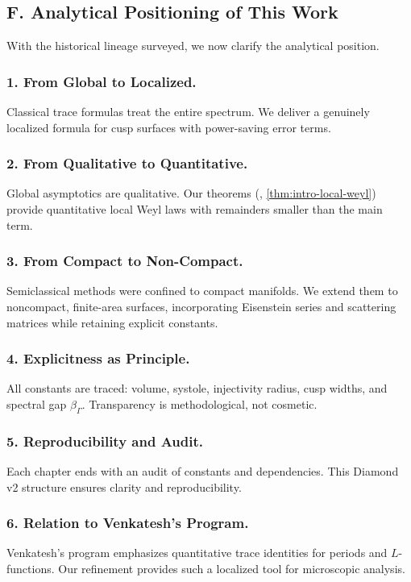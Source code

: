 \subsection*{F. Analytical Positioning of This Work}

With the historical lineage surveyed, we now clarify the analytical position.

\subsubsection*{1. From Global to Localized.}
Classical trace formulas treat the entire spectrum.
We deliver a genuinely localized formula for cusp surfaces
with power-saving error terms.

\subsubsection*{2. From Qualitative to Quantitative.}
Global asymptotics are qualitative.
Our theorems (, \ref{thm:intro-local-weyl})
provide quantitative local Weyl laws with remainders smaller than the main term.

\subsubsection*{3. From Compact to Non-Compact.}
Semiclassical methods were confined to compact manifolds.
We extend them to noncompact, finite-area surfaces,
incorporating Eisenstein series and scattering matrices
while retaining explicit constants.

\subsubsection*{4. Explicitness as Principle.}
All constants are traced: volume, systole, injectivity radius,
cusp widths, and spectral gap $\beta_\Gamma$.
Transparency is methodological, not cosmetic.

\subsubsection*{5. Reproducibility and Audit.}
Each chapter ends with an audit of constants and dependencies.
This Diamond v2 structure ensures clarity and reproducibility.

\subsubsection*{6. Relation to Venkatesh’s Program.}
Venkatesh’s program \cite{VenkateshProgram} emphasizes quantitative trace identities
for periods and $L$-functions.
Our refinement provides such a localized tool for microscopic analysis.

